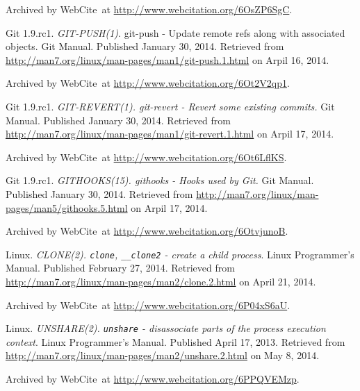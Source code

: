 \begin{thebibliography}{9}
Archived by WebCite\textsuperscript{\textregistered}\ at
\url{http://www.webcitation.org/6OsZP6SgC}.


Git 1.9.rc1. \emph{GIT-PUSH(1)}. git-push - Update remote refs along with
associated objects. Git Manual. Published January 30, 2014. Retrieved from
\url{http://man7.org/linux/man-pages/man1/git-push.1.html} on Arpil 16, 2014.

Archived by WebCite\textsuperscript{\textregistered}\ at
\url{http://www.webcitation.org/6Ot2V2qp1}.


Git 1.9.rc1. \emph{GIT-REVERT(1). git-revert - Revert some existing commits.}
Git Manual. Published January 30, 2014. Retrieved from
\url{http://man7.org/linux/man-pages/man1/git-revert.1.html} on Arpil 17, 2014.

Archived by WebCite\textsuperscript{\textregistered}\ at
\url{http://www.webcitation.org/6Ot6LflKS}.


Git 1.9.rc1. \emph{GITHOOKS(15). githooks - Hooks used by Git.} Git Manual.
Published January 30, 2014. Retrieved from
\url{http://man7.org/linux/man-pages/man5/githooks.5.html} on Arpil 17, 2014.

Archived by WebCite\textsuperscript{\textregistered}\ at
\url{http://www.webcitation.org/6OtvjunoB}.


Linux. \emph{CLONE(2). \texttt{clone}, \texttt{\_\_clone2} - create a child
process}. Linux Programmer's Manual. Published February 27, 2014. Retrieved
from \url{http://man7.org/linux/man-pages/man2/clone.2.html} on April 21, 2014.

Archived by WebCite\textsuperscript{\textregistered}\ at
\url{http://www.webcitation.org/6P04xS6aU}.


Linux. \emph{UNSHARE(2). \texttt{unshare} - disassociate parts of the process
execution context}. Linux Programmer's Manual. Published April 17, 2013.
Retrieved from \url{http://man7.org/linux/man-pages/man2/unshare.2.html} on May
8, 2014.

Archived by WebCite\textsuperscript{\textregistered}\ at
\url{http://www.webcitation.org/6PPQVEMzp}.



\end{thebibliography}
